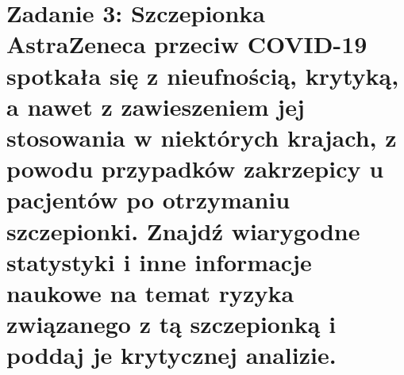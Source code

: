 \documentclass[11pt]{article}   %
\begin{document}
\section*{Zadanie 3: \normalsize {Szczepionka AstraZeneca przeciw COVID-19 spotkała się z nieufnością, krytyką, a nawet z
	zawieszeniem jej stosowania w niektórych krajach, z powodu przypadków zakrzepicy u
	pacjentów po otrzymaniu szczepionki. Znajdź wiarygodne statystyki i inne informacje naukowe
	na temat ryzyka związanego z tą szczepionką i poddaj je krytycznej analizie.}} 
	
\end{document}
